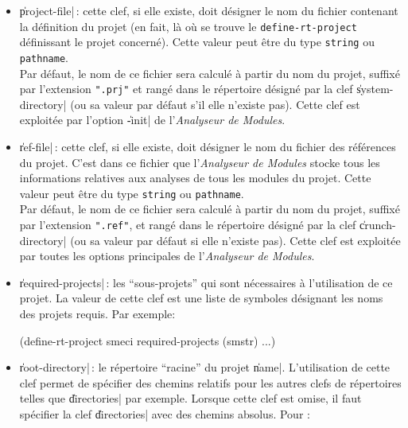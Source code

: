 \begin{itemize}
\begin{Side}{\bf Remarque}
Si aucun des fichiers 
sp\'{e}cifi\'{e}s avec la clef \|modules-list| ne figure dans un r\'{e}pertoire
donn\'{e} par la cl\'{e} \|directories| alors {\bf aucun}
module de {\em ce r\'{e}pertoire} ne sera pris en compte pour construire
les tables d'analyse. En mode \|-verbose 2|, un message est affich\'{e}
dans ce cas.
\end{Side}

\item {\Large \|project-file|}\,: cette clef, si elle existe, doit
d\'{e}signer le nom du fichier contenant la d\'{e}finition du projet (en
fait, l\`{a} o\`{u} se trouve le {\tt define-rt-project} d\'{e}finissant le
projet concern\'{e}). Cette
valeur peut \^{e}tre du type {\tt string} ou {\tt pathname}.  \\
Par d\'{e}faut, le nom de ce fichier sera calcul\'{e} \`{a} partir du nom du
projet, suffix\'{e} par l'extension {\tt ".prj"} et rang\'{e} dans le
r\'{e}pertoire d\'{e}sign\'{e} par la clef \|system-directory| (ou sa valeur
par d\'{e}faut s'il elle n'existe pas).
Cette clef est exploit\'{e}e par l'option \|-init| de l'{\em Analyseur de
Modules}.

\item {\Large \|ref-file|}\,: cette clef, si elle existe, doit d\'{e}signer
le nom du fichier des r\'{e}f\'{e}rences du projet. C'est dans ce fichier
que l'{\em Analyseur de Modules} stocke tous les informations relatives aux
analyses de tous les modules du projet. Cette
valeur peut \^{e}tre du type {\tt string} ou {\tt pathname}.  \\
Par d\'{e}faut, le nom de ce fichier sera calcul\'{e} \`{a} partir du nom du
projet, suffix\'{e} par l'extension {\tt ".ref"}, et rang\'{e} dans le
r\'{e}pertoire d\'{e}sign\'{e} par la clef \|crunch-directory| (ou sa valeur
par d\'{e}faut si elle n'existe pas).
Cette clef est exploit\'{e}e par toutes les options principales
de l'{\em Analyseur de Modules}.

\item {\Large \|required-projects|}\,: les ``sous-projets{''} qui sont
n\'{e}cessaires \`{a} l'utilisation de ce projet. La valeur de cette clef
est une liste de symboles d\'{e}signant les noms des projets requis. Par
exemple: 

\begin{Code*}
(define-rt-project smeci
   required-projects (smstr)
   ...)
\end{Code*}


\item {\Large \|root-directory|}\,: le r\'{e}pertoire ``racine{''} 
du projet \|name|. L'utilisation de cette clef
permet de sp\'{e}cifier des chemins relatifs pour les autres clefs de
r\'{e}pertoires telles que \|directories| par exemple.
Lorsque cette clef est omise, il faut sp\'{e}cifier la clef \|directories|
avec des chemins absolus. Pour \Aida:


\end{itemize}
